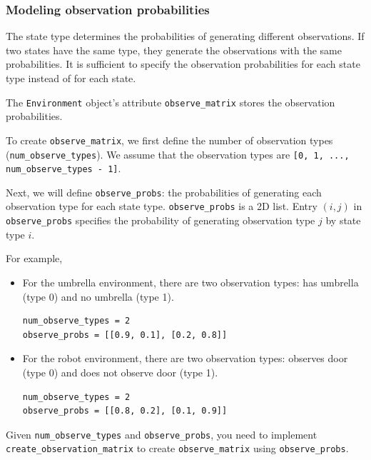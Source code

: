 \documentclass[12pt]{article}
\begin{document}
\subsubsection{Modeling observation probabilities}

The state type determines the probabilities of generating different observations. If two states have the same type, they generate the observations with the same probabilities.
It is sufficient to specify the observation probabilities for each state type instead of for each state. 

The \verb+Environment+ object's attribute \verb+observe_matrix+ stores the observation probabilities. 


To create \verb+observe_matrix+, we first define the number of observation types (\verb+num_observe_types+). We assume that the observation types are \verb+[0, 1, ..., num_observe_types - 1]+.

Next, we will define \verb+observe_probs+: the probabilities of generating each observation type for each state type. \verb+observe_probs+ is a 2D list. Entry $(i,j)$ in \verb+observe_probs+ specifies the probability of generating observation type $j$ by state type $i$.

For example, 
\begin{itemize}
\item 
For the umbrella environment, there are two observation types: has umbrella (type 0) and no umbrella (type 1).
%
\begin{verbatim}
num_observe_types = 2
observe_probs = [[0.9, 0.1], [0.2, 0.8]]
\end{verbatim}

\item 
For the robot environment, there are two observation types: observes door (type 0) and does not observe door (type 1).
%
\begin{verbatim}
num_observe_types = 2
observe_probs = [[0.8, 0.2], [0.1, 0.9]]
\end{verbatim}

\end{itemize}

Given \verb+num_observe_types+ and \verb+observe_probs+, you need to implement \\
\verb+create_observation_matrix+ to create \verb+observe_matrix+ using \verb+observe_probs+.
\end{document}
